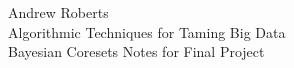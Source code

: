 \documentclass[12pt]{amsart}
\theoremstyle{plain}
\begin{document}
\begin{center}
Andrew Roberts \\
Algorithmic Techniques for Taming Big Data \\
Bayesian Coresets Notes for Final Project
\end{center}
\smallskip
\end{document}
